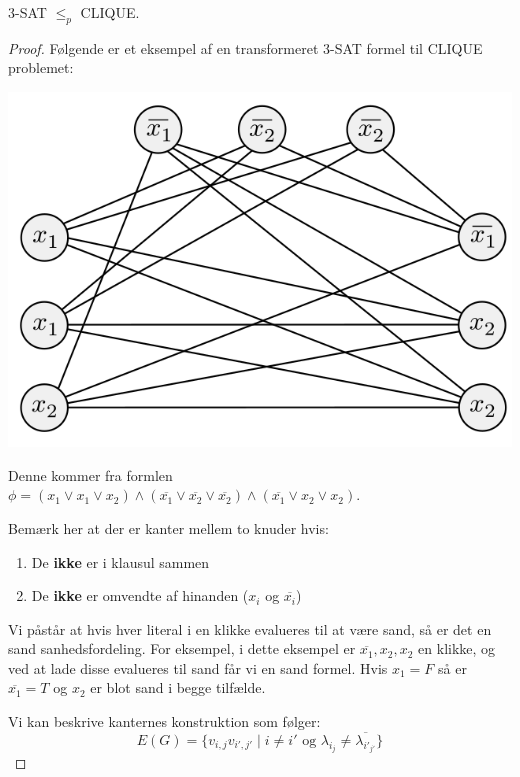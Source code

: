 \begin{theorem}
	\label{teo:3satredclique}
	3-SAT $\le_{p}$ CLIQUE.
\end{theorem}
\begin{proof}
	Følgende er et eksempel af en transformeret 3-SAT formel til CLIQUE problemet:
	\begin{center}
		\includegraphics[scale=0.5]{figur/figur733.png}
	\end{center}

	Denne kommer fra formlen $\phi = (x_{1} \vee x_{1} \vee x_{2}) \wedge (\overline{x_{1}} \vee \overline{x_{2}} \vee \overline{x_{2}}) \wedge (\overline{x_{1}} \vee x_{2} \vee x_{2})$.

	Bemærk her at der er kanter mellem to knuder hvis:
	\begin{enumerate}
		\item De \textbf{ikke} er i klausul sammen
		\item De \textbf{ikke} er omvendte af hinanden ($x_{i}$ og $\overline{x_{i}}$)
	\end{enumerate}
	Vi påstår at hvis hver literal i en klikke evalueres til at være sand, så er det en sand sanhedsfordeling. For eksempel, i dette eksempel er $\overline{x_{1}}, x_{2}, x_{2}$ en klikke, og ved at lade disse evalueres til sand får vi en sand formel. Hvis $x_{1} = F$ så er $\overline{x_{1}} = T$ og $x_{2}$ er blot sand i begge tilfælde.

	Vi kan beskrive kanternes konstruktion som følger:
	\begin{equation*}
		E(G) = \{v_{i,j} v_{i',j'} \mid i \ne i' \text{ og } \lambda_{i_{j}} \ne \overline{\lambda_{i'_{j'}}}\}
	\end{equation*}


\end{proof}
